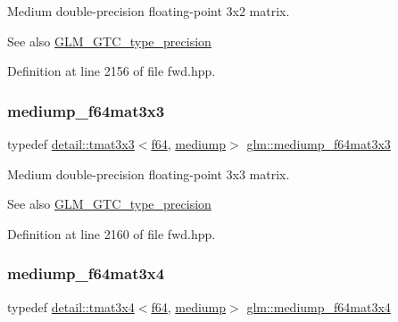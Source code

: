 Medium double-\/precision floating-\/point 3x2 matrix. \begin{DoxySeeAlso}{See also}
\hyperlink{group__gtc__type__precision}{G\+L\+M\+\_\+\+G\+T\+C\+\_\+type\+\_\+precision} 
\end{DoxySeeAlso}


Definition at line 2156 of file fwd.\+hpp.

\mbox{\label{group__gtc__type__precision_ga871b69a221dae7461aa746e6e6d372fc}} 
\subsubsection{\texorpdfstring{mediump\+\_\+f64mat3x3}{mediump\_f64mat3x3}}
{\footnotesize\ttfamily typedef \hyperlink{structglm_1_1detail_1_1tmat3x3}{detail\+::tmat3x3}$<$\hyperlink{group__gtc__type__precision_ga2bba392e555124b36cde6abba349bab3}{f64}, \hyperlink{namespaceglm_a0f04f086094c747d227af4425893f545a6416f3ea0c9025fb21ed50c4d6620482}{mediump}$>$ \hyperlink{group__gtc__type__precision_ga871b69a221dae7461aa746e6e6d372fc}{glm\+::mediump\+\_\+f64mat3x3}}

Medium double-\/precision floating-\/point 3x3 matrix. \begin{DoxySeeAlso}{See also}
\hyperlink{group__gtc__type__precision}{G\+L\+M\+\_\+\+G\+T\+C\+\_\+type\+\_\+precision} 
\end{DoxySeeAlso}


Definition at line 2160 of file fwd.\+hpp.

\mbox{\label{group__gtc__type__precision_gac3b0ca6d79631a2480cee8897dcd79ec}} 
\subsubsection{\texorpdfstring{mediump\+\_\+f64mat3x4}{mediump\_f64mat3x4}}
{\footnotesize\ttfamily typedef \hyperlink{structglm_1_1detail_1_1tmat3x4}{detail\+::tmat3x4}$<$\hyperlink{group__gtc__type__precision_ga2bba392e555124b36cde6abba349bab3}{f64}, \hyperlink{namespaceglm_a0f04f086094c747d227af4425893f545a6416f3ea0c9025fb21ed50c4d6620482}{mediump}$>$ \hyperlink{group__gtc__type__precision_gac3b0ca6d79631a2480cee8897dcd79ec}{glm\+::mediump\+\_\+f64mat3x4}}

